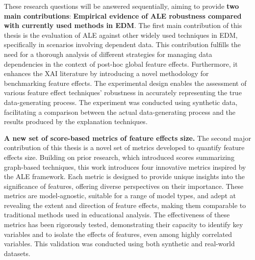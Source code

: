 These research questions will be answered sequentially, aiming to provide  \textbf{two main contributions}: \textbf{Empirical evidence of ALE robustness compared with currently used methods in EDM}. The first main contribution of this thesis is the evaluation of ALE against other widely used techniques in EDM, specifically in scenarios involving dependent data. This contribution fulfills the need for a thorough analysis of different strategies for managing data dependencies in the context of post-hoc global feature effects. Furthermore, it enhances the XAI literature by introducing a novel methodology for benchmarking feature effects. The experimental design enables the assessment of various feature effect techniques' robustness in accurately representing the true data-generating process. The experiment was conducted using synthetic data, facilitating a comparison between the actual data-generating process and the results produced by the explanation techniques.

\textbf{A new set of score-based metrics of feature effects size.} The second major contribution of this thesis is a novel set of metrics developed to quantify feature effects size. Building on prior research, which introduced scores summarizing graph-based techniques, \cite{long1997regression, Greenwell2018AMeasure, Lee2023SHAPForecasting} this work introduces four innovative metrics inspired by the ALE framework. Each metric is designed to provide unique insights into the significance of features, offering diverse perspectives on their importance. These metrics are model-agnostic, suitable for a range of model types, and adept at revealing the extent and direction of feature effects, making them comparable to traditional methods used in educational analysis. The effectiveness of these metrics has been rigorously tested, demonstrating their capacity to identify key variables and to isolate the effects of features, even among highly correlated variables. This validation was conducted using both synthetic and real-world datasets.

